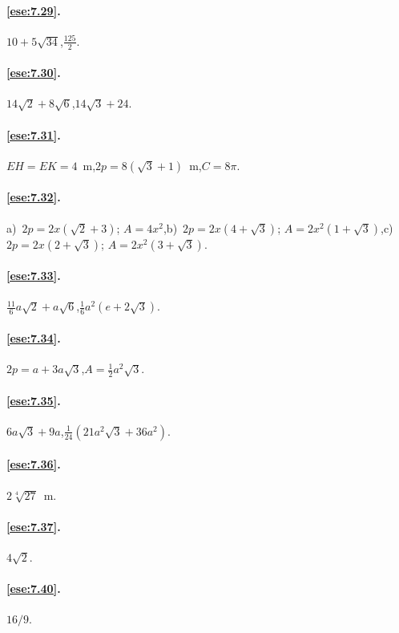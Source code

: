 \paragraph{\ref{ese:7.29}.}
$10+5\sqrt{34}$,\quad $\frac{125}{2}$.

\paragraph{\ref{ese:7.30}.}
$14\sqrt{2}+8\sqrt{6}$,\quad $14\sqrt{3}+24$.

\paragraph{\ref{ese:7.31}.}
$EH=EK=4$~m,\quad $2p=8(\sqrt{3}+1)$~m,\quad $C=8\pi$.

\paragraph{\ref{ese:7.32}.}
a)~$2p=2x(\sqrt{2}+3)$; $A=4x^2$,\quad b)~$2p=2x(4+\sqrt{3})$; 
$A=2x^2(1+\sqrt{3})$,\quad c)~$2p=2x(2+\sqrt{3})$; 
$A=2x^2(3+\sqrt{3})$.

\paragraph{\ref{ese:7.33}.}
$\frac{11}{6}a\sqrt{2}+a\sqrt{6}$,\quad $\frac{1}{6}a^2(e+2\sqrt{3})$.

\paragraph{\ref{ese:7.34}.}
$2p=a+3a\sqrt{3}$,\quad $A=\frac{1}{2}a^2\sqrt{3}$.

\paragraph{\ref{ese:7.35}.}
$6a\sqrt{3}+9a$,\quad $\frac{1}{24}(21a^2\sqrt{3}+36a^2)$.

\paragraph{\ref{ese:7.36}.}
$2\sqrt[4]{27}$~m.

\paragraph{\ref{ese:7.37}.}
$4\sqrt{2}$.

\paragraph{\ref{ese:7.40}.}
$16/9$.


